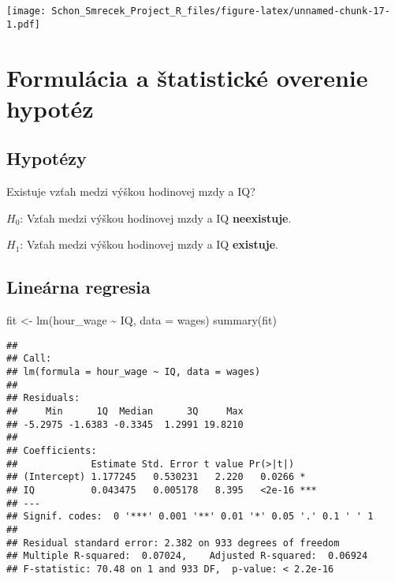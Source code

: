 \documentclass[
]{article}
\newenvironment{Shaded}{\begin{snugshade}}{\end{snugshade}}
\newcommand{\AttributeTok}[1]{\textcolor[rgb]{0.77,0.63,0.00}{#1}}
\newcommand{\FunctionTok}[1]{\textcolor[rgb]{0.00,0.00,0.00}{#1}}
\newcommand{\NormalTok}[1]{#1}
\newcommand{\OtherTok}[1]{\textcolor[rgb]{0.56,0.35,0.01}{#1}}
\newcommand{\SpecialCharTok}[1]{\textcolor[rgb]{0.00,0.00,0.00}{#1}}
\begin{document}
\texttt{[image: Schon\_Smrecek\_Project\_R\_files/figure-latex/unnamed-chunk-17-1.pdf]}

\hypertarget{formuluxe1cia-a-ux161tatistickuxe9-overenie-hypotuxe9z}{%
\section{Formulácia a štatistické overenie
hypotéz}\label{formuluxe1cia-a-ux161tatistickuxe9-overenie-hypotuxe9z}}

\hypertarget{hypotuxe9zy}{%
\subsection{Hypotézy}\label{hypotuxe9zy}}

Existuje vzťah medzi výškou hodinovej mzdy a IQ?

\(H_0\): Vzťah medzi výškou hodinovej mzdy a IQ \textbf{neexistuje}.

\(H_1\): Vzťah medzi výškou hodinovej mzdy a IQ \textbf{existuje}.

\hypertarget{lineuxe1rna-regresia}{%
\subsection{Lineárna regresia}\label{lineuxe1rna-regresia}}

\begin{Shaded}
\begin{Highlighting}[]
\NormalTok{fit }\OtherTok{\textless{}{-}} \FunctionTok{lm}\NormalTok{(hour\_wage }\SpecialCharTok{\textasciitilde{}}\NormalTok{ IQ, }\AttributeTok{data =}\NormalTok{ wages)}
\FunctionTok{summary}\NormalTok{(fit)}
\end{Highlighting}
\end{Shaded}

\begin{verbatim}
## 
## Call:
## lm(formula = hour_wage ~ IQ, data = wages)
## 
## Residuals:
##     Min      1Q  Median      3Q     Max 
## -5.2975 -1.6383 -0.3345  1.2991 19.8210 
## 
## Coefficients:
##             Estimate Std. Error t value Pr(>|t|)    
## (Intercept) 1.177245   0.530231   2.220   0.0266 *  
## IQ          0.043475   0.005178   8.395   <2e-16 ***
## ---
## Signif. codes:  0 '***' 0.001 '**' 0.01 '*' 0.05 '.' 0.1 ' ' 1
## 
## Residual standard error: 2.382 on 933 degrees of freedom
## Multiple R-squared:  0.07024,    Adjusted R-squared:  0.06924 
## F-statistic: 70.48 on 1 and 933 DF,  p-value: < 2.2e-16
\end{verbatim}
\end{document}
